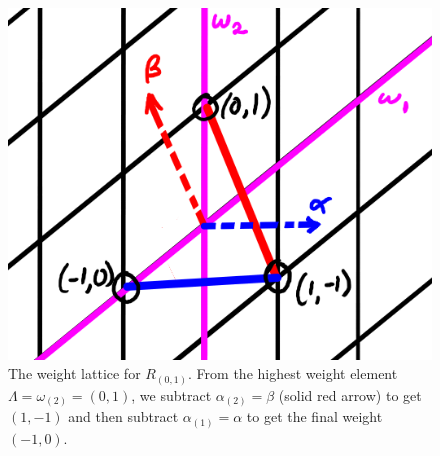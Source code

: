 \begin{figure}
    \centering
    \includegraphics{2018/11/20181122_s0-1.png}
    \caption{The weight lattice for $R_{(0,1)}$. From the highest weight element $\Lambda=\omega_{(2)}=(0,1)$, we subtract $\alpha_{(2)}=\beta$ (solid red arrow) to get $(1,-1)$ and then subtract $\alpha_{(1)}=\alpha$ to get the final weight $(-1,0)$.}
    \label{fig:s0-1}
\end{figure}

